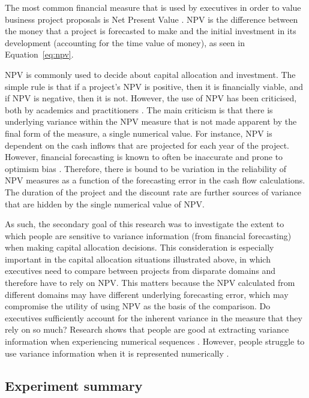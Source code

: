 \documentclass[a4paper, nobind, dvipsnames]{templates/ociamthesis}
\theoremstyle{definition}
\theoremstyle{definition}
\theoremstyle{definition}
\theoremstyle{definition}
\theoremstyle{remark}
\begin{document}
The most common financial measure that is used by executives in order to value
business project proposals is Net Present Value \autocites[NPV;][]{graham2001,remer1993,graham2015}. NPV is the difference between the money that a project is
forecasted to make and the initial investment in its development (accounting for
the time value of money), as seen in Equation~\eqref{eq:npv}.

NPV is commonly used to decide about capital allocation and investment. The
simple rule is that if a project's NPV is positive, then it is financially
viable, and if NPV is negative, then it is not. However, the use of NPV has been
criticised, both by academics and practitioners \autocite{fox2008,willigers2017}. The
main criticism is that there is underlying variance within the NPV measure that
is not made apparent by the final form of the measure, a single numerical value.
For instance, NPV is dependent on the cash inflows that are projected for each
year of the project. However, financial forecasting is known to often be
inaccurate and prone to optimism bias \autocite{lovallo2003,puri2007}. Therefore,
there is bound to be variation in the reliability of NPV measures as a function
of the forecasting error in the cash flow calculations. The duration of the
project and the discount rate are further sources of variance that are hidden by
the single numerical value of NPV.

As such, the secondary goal of this research was to investigate the extent to
which people are sensitive to variance information (from financial forecasting)
when making capital allocation decisions. This consideration is especially
important in the capital allocation situations illustrated above, in which
executives need to compare between projects from disparate domains and therefore
have to rely on NPV. This matters because the NPV calculated from different
domains may have different underlying forecasting error, which may compromise
the utility of using NPV as the basis of the comparison. Do executives
sufficiently account for the inherent variance in the measure that they rely on
so much? Research shows that people are good at extracting variance information
when experiencing numerical sequences \autocite{rosenbaum2020}. However, people struggle
to use variance information when it is represented numerically \autocite{galesic2010,konold1993,vivalt2021,batteux2020}.

\subsection{Experiment summary}
\end{document}

